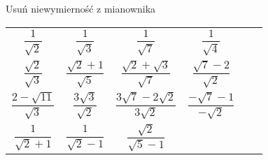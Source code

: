 \documentclass[a4paper,12pt,leqno,fleqn]{article}
\begin{document}
Usuń niewymierność z mianownika

\begin{tabularx}{\linewidth}{@{}XX@{}XX@{}XX@{}}

  \begin{equation}
    \frac{1}{\sqrt{2}}
  \end{equation}
&
  \begin{equation}
    \frac{1}{\sqrt{3}}
  \end{equation}
&
  \begin{equation}
    \frac{1}{\sqrt{7}}
  \end{equation}
&
  \begin{equation}
    \frac{1}{\sqrt{4}}
  \end{equation}
\\
  \begin{equation}
    \frac{\sqrt{2}}{\sqrt{3}}
  \end{equation}
&
  \begin{equation}
    \frac{\sqrt{2}+1}{\sqrt{5}}
  \end{equation}
&
  \begin{equation}
    \frac{\sqrt{2}+\sqrt{3}}{\sqrt{7}}
  \end{equation}
&
  \begin{equation}
    \frac{\sqrt{7}-2}{\sqrt{2}}
  \end{equation}
\\
  \begin{equation}
    \frac{2-\sqrt{11}}{\sqrt{3}}
  \end{equation}
&
  \begin{equation}
    \frac{3\sqrt{3}}{\sqrt{2}}
  \end{equation}
&
  \begin{equation}
    \frac{3\sqrt{7}-2\sqrt{2}}{3\sqrt{2}}
  \end{equation}
&
  \begin{equation}
    \frac{-\sqrt{7}-1}{-\sqrt{2}}
  \end{equation}
\\
  \begin{equation}
    \frac{1}{\sqrt{2}+1}
  \end{equation}
&
  \begin{equation}
    \frac{1}{\sqrt{2}-1}
  \end{equation}
&
  \begin{equation}
    \frac{\sqrt{2}}{\sqrt{5}-1}
  \end{equation}
&
  \begin{equation}

\end{equation}
\end{tabularx}
\end{document}
